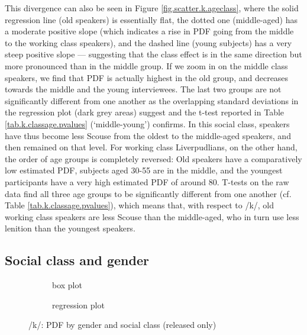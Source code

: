 This divergence can also be seen in Figure \ref{fig.scatter.k.ageclass}, where the solid regression line (old speakers) is essentially flat, the dotted one (middle-aged) has a moderate positive slope (which indicates a rise in PDF going from the middle to the working class speakers), and the dashed line (young subjects) has a very steep positive slope --- suggesting that the class effect is in the same direction but more pronounced than in the middle group.
If we zoom in on the middle class speakers, we find that PDF is actually highest in the old group, and decreases towards the middle and the young interviewees. The last two groups are not significantly different from one another as the overlapping standard deviations in the regression plot (dark grey areas) suggest and the t-test reported in Table \ref{tab.k.classage.pvalues} (`middle-young') confirms.
In this social class, speakers have thus become less Scouse from the oldest to the middle-aged speakers, and then remained on that level.
For working class Liverpudlians, on the other hand, the order of age groups is completely reversed: Old speakers have a comparatively low estimated PDF, subjects aged 30-55 are in the middle, and the youngest participants have a very high estimated PDF of around 80.
T-tests on the raw data find all three age groups to be significantly different from one another (cf. Table \ref{tab.k.classage.pvalues}), which means that, with respect to /k/, old working class speakers are less Scouse than the middle-aged, who in turn use less lenition than the youngest speakers.

\subsection{Social class and gender}
\label{sec.prod.res.con.k.classgender}

\begin{figure}[h]
	\centering
	\begin{subfigure}{.49\textwidth}
		\centering
			\resizebox{\linewidth}{!}{} 
		\caption{box plot}
		\label{fig.box.k.classgender}
	\end{subfigure}
	\begin{subfigure}{.49\textwidth}
		\centering
			\resizebox{\linewidth}{!}{} 
		\caption{regression plot}
		\label{fig.scatter.k.classgender}
	\end{subfigure}
	\caption{/k/: PDF by gender and social class (released only)}
\end{figure}

